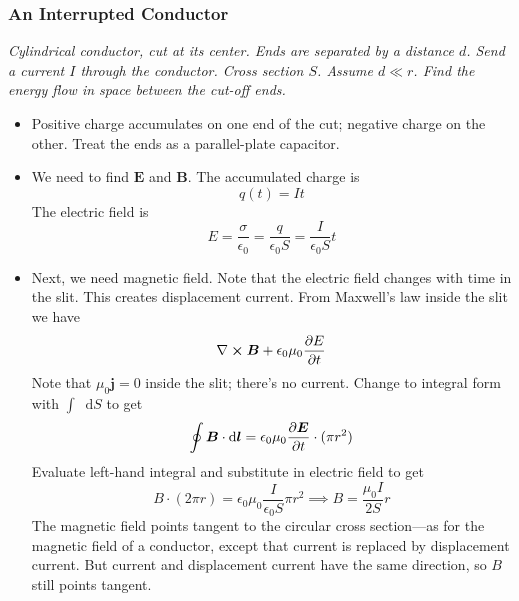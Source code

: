 \documentclass[11pt, a4paper]{article}
\newcommand{\diff}{\mathop{}\!\mathrm{d}} %
\renewcommand{\vec}[1]{\bm{#1}} %
\newcommand{\E}{\vec{E}}  %
\newcommand{\B}{\vec{B}}  %
\newcommand{\ee}{\epsilon_{0}}  %
\newcommand{\mm}{\mu_{0}}  %
\newcommand{\m}{\vec{m}}  %
\renewcommand{\curl}{\nabla \cross}
\begin{document}
\subsubsection{An Interrupted Conductor}
\textit{Cylindrical conductor, cut at its center. Ends are separated by a distance $ d $. Send a current $ I $ through the conductor. Cross section $ S $. Assume $ d \ll r$. Find the energy flow in space between the cut-off ends.}

\begin{itemize}
	\item Positive charge accumulates on one end of the cut; negative charge on the other. Treat the ends as a parallel-plate capacitor. 
	
	\item We need to find $ \E $ and $ \B $. The accumulated charge is
	\begin{equation*}
		q(t) = It
	\end{equation*}
	The electric field is 
	\begin{equation*}
		E = \frac{\sigma}{\ee} = \frac{q}{\ee S} = \frac{I}{\ee S}t
	\end{equation*}
	
	\item Next, we need magnetic field. Note that the electric field changes with time in the slit. This creates displacement current. From Maxwell's law inside the slit we have
	\begin{equation*}
		\curl \B + \ee\mm \pdv{E}{t}
	\end{equation*}
	Note that $ \mm \vec{j} = 0 $ inside the slit; there's no current. Change to integral form with $ \int \diff S $ to get
	\begin{equation*}
		\oint \B \cdot \diff \vec{l}  = \ee \mm \pdv{\E}{t} \cdot (\pi r^{2})
	\end{equation*}
	Evaluate left-hand integral and substitute in electric field to get
	\begin{equation*}
		B \cdot (2\pi r) = \ee \mm \frac{I}{\ee S} \pi r^{2} \implies B = \frac{\mm I}{2S} r
	\end{equation*}
	The magnetic field points tangent to the circular cross section---as for the magnetic field of a conductor, except that current is replaced by displacement current. But current and displacement current have the same direction, so $ B $ still points tangent.
	

\end{itemize}
\end{document}
